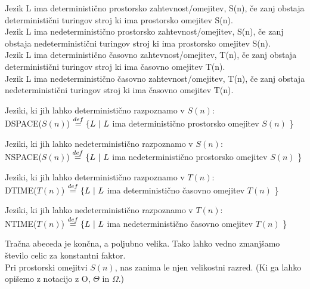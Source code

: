 \documentclass[10pt,a4paper,oneside]{book}
\begin{document}
Jezik L ima deterministično prostorsko zahtevnost/omejitev, S(n), če zanj obstaja deterministični turingov stroj ki ima prostorsko omejitev S(n).\\
Jezik L ima nedeterministično prostorsko zahtevnost/omejitev, S(n), če zanj obstaja nedeterministični turingov stroj ki ima prostorsko omejitev S(n).\\
Jezik L ima deterministično časovno zahtevnost/omejitev, T(n), če zanj obstaja deterministični turingov stroj ki ima časovno omejitev T(n).\\
Jezik L ima nedeterministično časovno zahtevnost/omejitev, T(n), če zanj obstaja nedeterministični turingov stroj ki ima časovno omejitev T(n).
\br
{}
\begin{items}
\item Jeziki, ki jih lahko deterministično razpoznamo v $S(n)$:\\
DSPACE($S(n)$) $\overset{def}{=} \{ L\ |\ L$ ima deterministično prostorsko omejitev $S(n)$ \}
\item Jeziki, ki jih lahko nedeterministično razpoznamo v $S(n)$:\\
NSPACE($S(n)$) $\overset{def}{=} \{ L\ |\ L$ ima nedeterministično prostorsko omejitev $S(n)$ \}
\item Jeziki, ki jih lahko deterministično razpoznamo v $T(n)$:\\
DTIME($T(n)$) $\overset{def}{=} \{ L\ |\ L$ ima deterministično časovno omejitev $T(n)$ \}
\item Jeziki, ki jih lahko nedeterministično razpoznamo v $T(n)$:\\
NTIME($T(n)$) $\overset{def}{=} \{ L\ |\ L$ ima nedeterministično časovno omejitev $T(n)$ \}
\end{items}
Tračna abeceda je končna, a poljubno velika.
Tako lahko vedno zmanjšamo število celic za konstantni faktor.\\%
Pri prostorski omejitvi $S(n)$, nas zanima le njen velikostni razred. (Ki ga lahko opišemo z notacijo z O, $\Theta$ in $\Omega$.)
\end{document}
